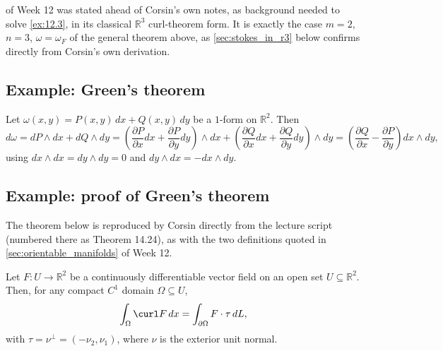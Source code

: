 \begin{ainote}
 of Week 12 was stated ahead of Corsin's own notes, as background
needed to solve \cref{ex:12.3}, in its classical $\mathbb{R}^3$ curl-theorem form. It is
exactly the case $m=2$, $n=3$, $\omega=\omega_F$ of the general theorem above, as
\cref{sec:stokes_in_r3} below confirms directly from Corsin's own derivation.
\end{ainote}

\subsection{Example: Green's theorem}
\label{sec:green_theorem_example}

\begin{example}
\label{ex:exterior_derivative_r2}
Let $\omega(x,y) = P(x,y)\,dx + Q(x,y)\,dy$ be a $1$-form on $\mathbb{R}^2$. Then
\[
d\omega = dP\wedge dx + dQ\wedge dy = \left(\frac{\partial P}{\partial x}dx +
  \frac{\partial P}{\partial y}dy\right)\wedge dx + \left(\frac{\partial Q}{\partial x}dx +
  \frac{\partial Q}{\partial y}dy\right)\wedge dy = \left(\frac{\partial Q}{\partial x} -
  \frac{\partial P}{\partial y}\right) dx\wedge dy,
\]
using $dx\wedge dx = dy\wedge dy = 0$ and $dy\wedge dx = -dx\wedge dy$.
\end{example}

\subsection{Example: proof of Green's theorem}
\label{sec:green_theorem_proof}

\begin{ainote}
The theorem below is reproduced by Corsin directly from the lecture script (numbered there as
Theorem 14.24), as with the two definitions quoted in \cref{sec:orientable_manifolds} of
Week 12.
\end{ainote}

\begin{theorem}
\label{thm:green_theorem}
Let $F : U \to \mathbb{R}^2$ be a continuously differentiable vector field on an open set
$U \subseteq \mathbb{R}^2$. Then, for any compact $C^1$ domain $\Omega \subseteq U$,
\[\int_\Omega \curl F\,dx = \int_{\partial\Omega} F\cdot\tau\,dL,\]
with $\tau = \nu^\perp = (-\nu_2,\nu_1)$, where $\nu$ is the exterior unit normal.
\end{theorem}


